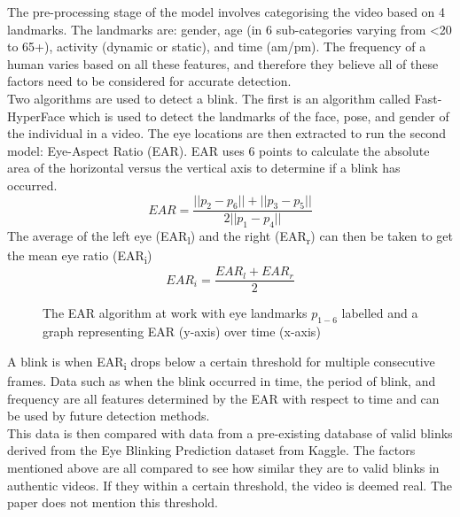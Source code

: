 \documentclass{article}
\begin{document}
The pre-processing stage of the model involves categorising the video based on 4 landmarks. The landmarks are: gender, age (in 6 sub-categories varying from \textless 20 to 65+), activity (dynamic or static), and time (am/pm). The frequency of a human varies based on all these features\cite{varying-blink}, and therefore they believe all of these factors need to be considered for accurate detection.\\

Two algorithms are used to detect a blink. The first is an algorithm called Fast-HyperFace\cite{ranjan2017hyperface} which is used to detect the landmarks of the face, pose, and gender of the individual in a video. The eye locations are then extracted to run the second model: Eye-Aspect Ratio (EAR). EAR uses 6 points to calculate the absolute area of the horizontal versus the vertical axis to determine if a blink has occurred\cite{EAR}.
\begin{equation}
    EAR=\frac{||p_2-p_6||+||p_3-p_5||}{2||p_1-p_4||}
\end{equation}
The average of the left eye (EAR\textsubscript{l}) and the right (EAR\textsubscript{r}) can then be taken to get the mean eye ratio (EAR\textsubscript{i})
\begin{equation}
    EAR_i = \frac{EAR_l + EAR_r}{2}
\end{equation}
\begin{figure}[H]
    \centering
    \caption{The EAR algorithm at work with eye landmarks $p_{1-6}$ labelled and a graph representing EAR (y-axis) over time (x-axis)}
    \label{fig:EAR}
\end{figure}

A blink is when EAR\textsubscript{i} drops below a certain threshold for multiple consecutive frames. Data such as when the blink occurred in time, the period of blink, and frequency are all features determined by the EAR with respect to time and can be used by future detection methods.\\

This data is then compared with data from a pre-existing database of valid blinks derived from the Eye Blinking Prediction dataset from Kaggle\cite{eyeblinkprediction}. The factors mentioned above are all compared to see how similar they are to valid blinks in authentic videos. If they within a certain threshold, the video is deemed real. The paper does not mention this threshold.\\
\end{document}

